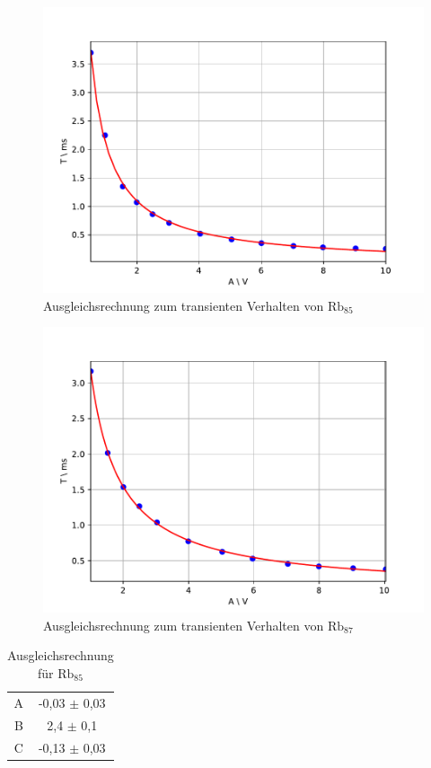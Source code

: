 \begin{figure}[h]
\centering
\includegraphics[scale=0.8]{img/trans1.pdf}
\caption{Ausgleichsrechnung zum transienten Verhalten von $\text{Rb}_{85}$}
\label{trans1}
\end{figure}

\begin{figure}[h]
\centering
\includegraphics[scale=0.8]{img/trans2.pdf}
\caption{Ausgleichsrechnung zum transienten Verhalten von $\text{Rb}_{87}$}
\label{trans2}
\end{figure}

\begin{table}[h!]
\centering
\begin{tabular}{cc} \toprule
\centering
A & -0,03 $\pm$ 0,03 \\
B & 2,4 $\pm$ 0,1 \\
C & -0,13 $\pm$ 0,03 \\
\bottomrule
\end{tabular}
\label{x}
\caption{Ausgleichsrechnung für $\text{Rb}_{85}$}
\end{table}

